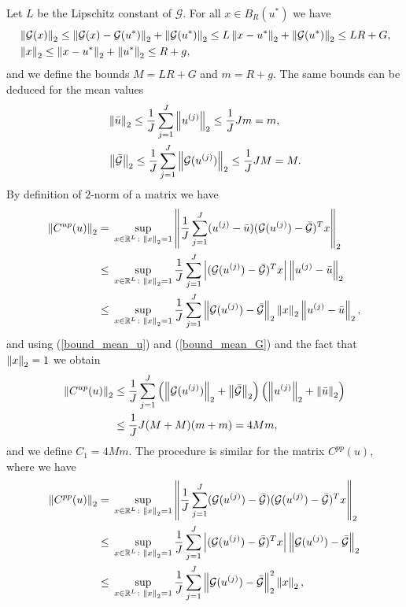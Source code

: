 Let $L$ be the Lipschitz constant of $\mathcal{G}$. For all $x \in B_R(u^*)$ we have
\begin{align*}
& \left\|\mathcal{G}(x)\right\|_2 \le \left\|\mathcal{G}(x) - \mathcal{G}(u^*)\right\|_2 + \left\|\mathcal{G}(u^*)\right\|_2 \le L \left\|x - u^*\right\|_2 + \left\|\mathcal{G}(u^*)\right\|_2 \le LR + G, \\
& \left\|x\right\|_2 \le \left\|x - u^*\right\|_2 + \left\|u^*\right\|_2 \le R + g,
\end{align*}
and we define the bounds $M = LR + G$ and $m = R + g$. The same bounds can be deduced for the mean values
\begin{align}
\label{bound_mean_u}
& \left\|\bar{u}\right\|_2 \le \frac{1}{J} \sum_{j=1}^J \left\|u^{(j)}\right\|_2 \le \frac{1}{J} J m = m, \\
\label{bound_mean_G}
& \left\|\bar{\mathcal{G}}\right\|_2 \le \frac{1}{J} \sum_{j=1}^J \left\|\mathcal{G}(u^{(j)})\right\|_2 \le \frac{1}{J} J M = M.
\end{align}
By definition of $2$-norm of a matrix we have
\begin{align*}
\left\|C^{up}(u)\right\|_2 = & \; \sup_{x \in \mathbb{R}^L \colon \left\|x\right\|_2 = 1} \left \lVert \frac{1}{J} \sum_{j=1}^J (u^{(j)} - \bar{u}) (\mathcal{G}(u^{(j)}) - \bar{\mathcal{G}})^T x \right \rVert_2 \\
\le & \; \sup_{x \in \mathbb{R}^L \colon \left\|x\right\|_2 = 1} \frac{1}{J} \sum_{j=1}^J \left | (\mathcal{G}(u^{(j)}) - \bar{\mathcal{G}})^T x \right | \left\|u^{(j)} - \bar{u}\right\|_2 \\
\le & \; \sup_{x \in \mathbb{R}^L \colon \left\|x\right\|_2 = 1} \frac{1}{J} \sum_{j=1}^J \left \lVert \mathcal{G}(u^{(j)}) - \bar{\mathcal{G}} \right \rVert_2 \left\|x\right\|_2 \left\|u^{(j)} - \bar{u}\right\|_2,
\end{align*}
and using (\ref{bound_mean_u}) and (\ref{bound_mean_G}) and the fact that $\left\|x\right\|_2 = 1$ we obtain
\begin{align*}
\left\|C^{up}(u)\right\|_2 \le & \; \frac{1}{J} \sum_{j=1}^J \left ( \left\|\mathcal{G}(u^{(j)})\right\|_2 + \left\|\bar{\mathcal{G}}\right\|_2 \right ) \left ( \left\|u^{(j)}\right\|_2 + \left\|\bar{u}\right\|_2 \right ) \\
\le & \; \frac{1}{J} J (M + M) (m + m) = 4Mm,
\end{align*}
and we define $C_1 = 4Mm$.
The procedure is similar for the matrix $C^{pp}(u)$, where we have
\begin{align*}
\left\|C^{pp}(u)\right\|_2 = & \; \sup_{x \in \mathbb{R}^L \colon \left\|x\right\|_2 = 1} \left \lVert \frac{1}{J} \sum_{j=1}^J (\mathcal{G}(u^{(j)}) - \bar{\mathcal{G}}) (\mathcal{G}(u^{(j)}) - \bar{\mathcal{G}})^T x \right \rVert_2 \\
\le & \; \sup_{x \in \mathbb{R}^L \colon \left\|x\right\|_2 = 1} \frac{1}{J} \sum_{j=1}^J \left | (\mathcal{G}(u^{(j)}) - \bar{\mathcal{G}})^T x \right | \left \lVert \mathcal{G}(u^{(j)}) - \bar{\mathcal{G}} \right \rVert_2 \\
\le & \; \sup_{x \in \mathbb{R}^L \colon \left\|x\right\|_2 = 1} \frac{1}{J} \sum_{j=1}^J \left \lVert \mathcal{G}(u^{(j)}) - \bar{\mathcal{G}} \right \rVert^2_2 \left\|x\right\|_2,
\end{align*}
